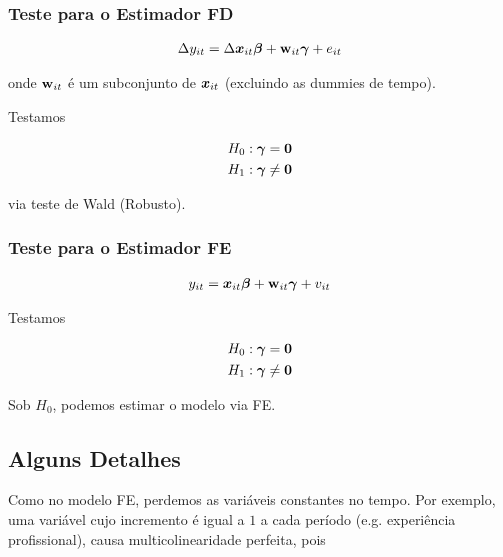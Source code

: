 \documentclass[11pt, oneside, a4paper, article]{article}
\numberwithin{equation}{section}
\begin{document}
\begin{description}
\subsubsection{Teste para o Estimador FD}

\vspace{-2 em}
\begin{align*}
	\Delta y_{it} = \Delta \boldsymbol{x}_{it} \boldsymbol{\beta} + \mathbf{w}_{it} \boldsymbol{\gamma} + e_{it}
\end{align*}

\noindent
onde $\mathbf{w}_{it}$ é um subconjunto de $\boldsymbol{x}_{it}$ (excluindo as dummies de tempo).

Testamos

\vspace{-2 em}
\begin{align*}
	H_{0}: \boldsymbol{\gamma} = \boldsymbol{0}
	\\
	H_{1}: \boldsymbol{\gamma} \neq \boldsymbol{0}
\end{align*}

\noindent
via teste de Wald (Robusto).

\subsubsection{Teste para o Estimador FE}

\vspace{-2 em}
\begin{align*}
	y_{it} = \boldsymbol{x}_{it} \boldsymbol{\beta} + \mathbf{w}_{it} \boldsymbol{\gamma} + v_{it}
\end{align*}

Testamos

\vspace{-2 em}
\begin{align*}
	H_{0}: \boldsymbol{\gamma} = \boldsymbol{0}
	\\
	H_{1}: \boldsymbol{\gamma} \neq \boldsymbol{0}
\end{align*}

\noindent
Sob $H_{0}$, podemos estimar o modelo via FE.

\subsection{Alguns Detalhes}

\begin{remark}
Como no modelo FE, perdemos as variáveis constantes no tempo.
Por exemplo, uma variável cujo incremento é igual a $1$ a cada período (e.g. experiência profissional), causa multicolinearidade perfeita, pois


\end{remark}
\end{description}
\end{document}
